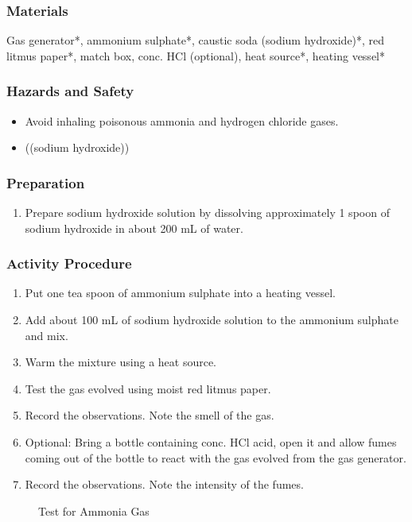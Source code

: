 \subsubsection*{Materials}
Gas generator*, ammonium sulphate*, caustic soda (sodium hydroxide)*, red litmus paper*, match box, conc. HCl (optional), heat source*, heating vessel*

\subsubsection*{Hazards and Safety}
\begin{itemize}
\item{Avoid inhaling poisonous ammonia and hydrogen chloride gases.}
\item{((sodium hydroxide))}
\end{itemize}

\subsubsection*{Preparation}
\begin{enumerate}
\item{Prepare sodium hydroxide solution by dissolving approximately 1 spoon of sodium hydroxide in about 200 mL of water.}
\end{enumerate}

\subsubsection*{Activity Procedure}
\begin{enumerate}
\item{Put one tea spoon of ammonium sulphate into a heating vessel.}
\item{Add about 100 mL of sodium hydroxide solution to the ammonium sulphate and mix.}
\item{Warm the mixture using a heat source.}
\item{Test the gas evolved using moist red litmus paper.}
\item{Record the observations. Note the smell of the gas.}
\item{Optional: Bring a bottle containing conc. HCl acid, open it and allow fumes coming out of the bottle to react with the gas evolved from the gas generator.}
\item{Record the observations. Note the intensity of the fumes.}
\end{enumerate}


\begin{figure}[h]
\begin{center}
\def\svgwidth{200pt}

\caption{Test for Ammonia Gas}
\end{center}
\end{figure}

